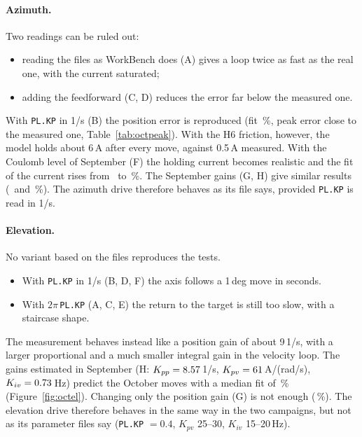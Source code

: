 \documentclass[10pt,a4paper]{article}
\numberwithin{equation}{section}
\begin{document}
\paragraph{Azimuth.} Two readings can be ruled out:
\begin{itemize}
\item reading the files as WorkBench does (A) gives a loop twice as fast as the real one, with the current saturated;
\item adding the feedforward (C, D) reduces the error far below the measured one.
\end{itemize}
With \texttt{PL.KP} in 1/s (B) the position error is reproduced (fit \OctFitAzB\,\%, peak error close to the measured one, Table~\ref{tab:octpeak}). With the H6 friction, however, the model holds about 6\,A after every move, against 0.5\,A measured. With the Coulomb level of September (F) the holding current becomes realistic and the fit of the current rises from \OctCurAzB\ to \OctCurAzF\,\%. The September gains (G, H) give similar results (\OctFitAzG\ and \OctFitAzH\,\%). The azimuth drive therefore behaves as its file says, provided \texttt{PL.KP} is read in 1/s.

\paragraph{Elevation.} No variant based on the files reproduces the tests.
\begin{itemize}
\item With \texttt{PL.KP} in 1/s (B, D, F) the axis follows a 1\,deg move in seconds.
\item With $2\pi$\,\texttt{PL.KP} (A, C, E) the return to the target is still too slow, with a staircase shape.
\end{itemize}
The measurement behaves instead like a position gain of about 9\,1/s, with a larger proportional and a much smaller integral gain in the velocity loop. The gains estimated in September (H: $K_{pp}=8.57$\,1/s, $K_{pv}=61$\,A/(rad/s), $K_{iv}=0.73$\,Hz) predict the October moves with a median fit of \OctFitElH\,\% (Figure~\ref{fig:octel}). Changing only the position gain (G) is not enough (\OctFitElG\,\%). The elevation drive therefore behaves in the same way in the two campaigns, but not as its parameter files say (\texttt{PL.KP} $=0.4$, $K_{pv}$ 25--30, $K_{iv}$ 15--20\,Hz).
\end{document}

